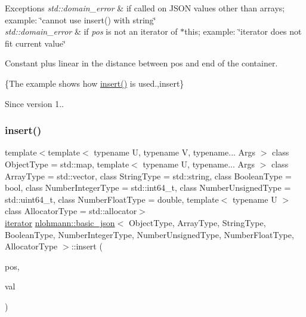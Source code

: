 \begin{DoxyExceptions}{Exceptions}
{\em std\+::domain\+\_\+error} & if called on J\+S\+ON values other than arrays; example\+: {\ttfamily \char`\"{}cannot use insert() with string\char`\"{}} \\
\hline
{\em std\+::domain\+\_\+error} & if {\itshape pos} is not an iterator of $\ast$this; example\+: {\ttfamily \char`\"{}iterator does not fit current value\char`\"{}}\\
\hline
\end{DoxyExceptions}
Constant plus linear in the distance between pos and end of the container.

\{The example shows how {\ttfamily \hyperlink{classnlohmann_1_1basic__json_a7f7bbb3a9efef2e2442f538a24c1c47b}{insert()}} is used.,insert\}

\begin{DoxySince}{Since}
version 1.. 
\end{DoxySince}
\hypertarget{classnlohmann_1_1basic__json_a8468efcfcd95db15f46887b29924ed5c}{}\label{classnlohmann_1_1basic__json_a8468efcfcd95db15f46887b29924ed5c} 
\subsubsection{\texorpdfstring{insert()}{insert()}\hspace{0.1cm}{\footnotesize\ttfamily [2/5]}}
{\footnotesize\ttfamily template$<$template$<$ typename U, typename V, typename... Args $>$ class Object\+Type = std\+::map, template$<$ typename U, typename... Args $>$ class Array\+Type = std\+::vector, class String\+Type  = std\+::string, class Boolean\+Type  = bool, class Number\+Integer\+Type  = std\+::int64\+\_\+t, class Number\+Unsigned\+Type  = std\+::uint64\+\_\+t, class Number\+Float\+Type  = double, template$<$ typename U $>$ class Allocator\+Type = std\+::allocator$>$ \\
\hyperlink{classnlohmann_1_1basic__json_1_1iterator}{iterator} \hyperlink{classnlohmann_1_1basic__json}{nlohmann\+::basic\+\_\+json}$<$ Object\+Type, Array\+Type, String\+Type, Boolean\+Type, Number\+Integer\+Type, Number\+Unsigned\+Type, Number\+Float\+Type, Allocator\+Type $>$\+::insert (\begin{DoxyParamCaption}\item[{\hyperlink{classnlohmann_1_1basic__json_1_1const__iterator}{const\+\_\+iterator}}]{pos,  }\item[{\hyperlink{classnlohmann_1_1basic__json}{basic\+\_\+json}$<$ Object\+Type, Array\+Type, String\+Type, Boolean\+Type, Number\+Integer\+Type, Number\+Unsigned\+Type, Number\+Float\+Type, Allocator\+Type $>$ \&\&}]{val }\end{DoxyParamCaption})\hspace{0.3cm}{\ttfamily [inline]}}



